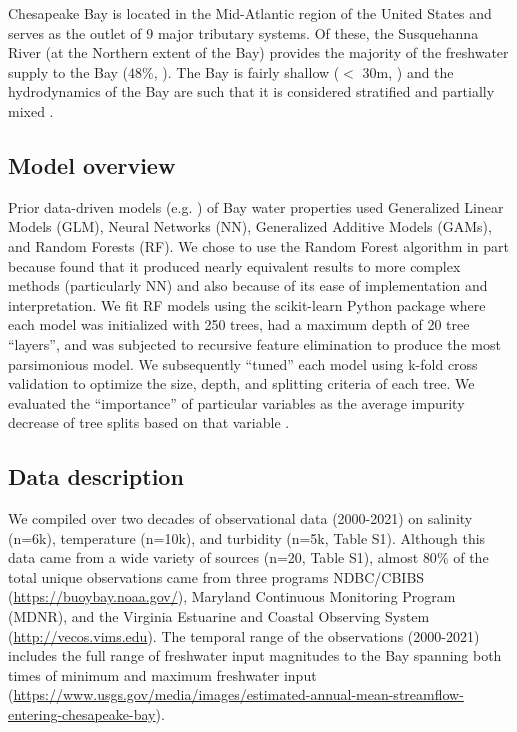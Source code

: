 \documentclass{article}
\begin{document}
Chesapeake Bay is located in the Mid-Atlantic region of the United States and serves as the outlet of 9 major tributary systems. Of these, the Susquehanna River (at the Northern extent of the Bay) provides the majority of the freshwater supply to the Bay (\texttildelow$48\%$, \citet{xuClimateForcingSalinity2012}). The Bay is fairly shallow ($<$ 30m, \citet{murphyComparisonSpatialInterpolation2010}) and the hydrodynamics of the Bay are such that it is considered stratified and partially mixed \citep{xuClimateForcingSalinity2012}.

\subsection{Model overview}

Prior data-driven models (e.g. \citet{urquhartGeospatialInterpolationMODISderived2013, vogelAssessingSatelliteSea2016}) of Bay water properties used Generalized Linear Models (GLM), Neural Networks (NN), Generalized Additive Models (GAMs), and Random Forests (RF). We chose to use the Random Forest algorithm in part because \citet{urquhartGeospatialInterpolationMODISderived2013} found that it produced nearly equivalent results to more complex methods (particularly NN) and also because of its ease of implementation and interpretation. We fit RF models using the scikit-learn Python package \citep{pedregosaScikitlearnMachineLearning2011} where each model was initialized with 250 trees, had a maximum depth of 20 tree “layers”, and was subjected to recursive feature elimination to produce the most parsimonious model. We subsequently “tuned” each model using k-fold cross validation to optimize the size, depth, and splitting criteria of each tree. We evaluated the “importance” of particular variables as the average impurity decrease of tree splits based on that variable \citep{pedregosaScikitlearnMachineLearning2011}.

\subsection{Data description}

\begin{sloppypar}

We compiled over two decades of observational data (2000-2021) on salinity (n=6k), temperature (n=10k), and turbidity (n=5k, Table S1). Although this data came from a wide variety of sources (n=20, Table S1), almost $80\%$ of the total unique observations came from three programs NDBC/CBIBS (\url{https://buoybay.noaa.gov/}), Maryland Continuous Monitoring Program (MDNR), and the Virginia Estuarine and Coastal Observing System (\url{http://vecos.vims.edu}). The temporal range of the observations (2000-2021) includes the full range of freshwater input magnitudes to the Bay spanning both times of minimum and maximum freshwater input (\url{https://www.usgs.gov/media/images/estimated-annual-mean-streamflow-entering-chesapeake-bay}).

\end{sloppypar}
\end{document}
